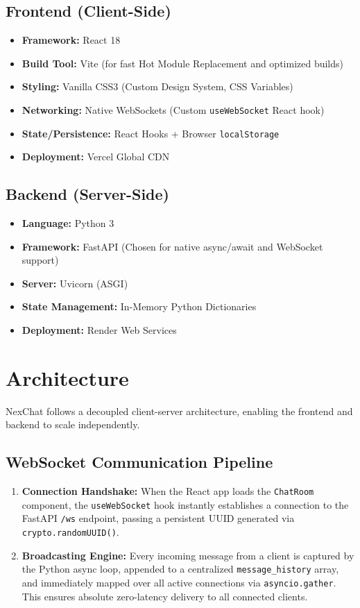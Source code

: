 \documentclass[12pt, a4paper]{article}
\begin{document}
\subsection{Frontend (Client-Side)}
\begin{itemize}
    \item \textbf{Framework:} React 18
    \item \textbf{Build Tool:} Vite (for fast Hot Module Replacement and optimized builds)
    \item \textbf{Styling:} Vanilla CSS3 (Custom Design System, CSS Variables)
    \item \textbf{Networking:} Native WebSockets (Custom \texttt{useWebSocket} React hook)
    \item \textbf{State/Persistence:} React Hooks + Browser \texttt{localStorage}
    \item \textbf{Deployment:} Vercel Global CDN
\end{itemize}

\subsection{Backend (Server-Side)}
\begin{itemize}
    \item \textbf{Language:} Python 3
    \item \textbf{Framework:} FastAPI (Chosen for native async/await and WebSocket support)
    \item \textbf{Server:} Uvicorn (ASGI)
    \item \textbf{State Management:} In-Memory Python Dictionaries
    \item \textbf{Deployment:} Render Web Services
\end{itemize}

\section{Architecture}
NexChat follows a decoupled client-server architecture, enabling the frontend and backend to scale independently.

\subsection{WebSocket Communication Pipeline}
\begin{enumerate}
    \item \textbf{Connection Handshake:} When the React app loads the \texttt{ChatRoom} component, the \texttt{useWebSocket} hook instantly establishes a connection to the FastAPI \texttt{/ws} endpoint, passing a persistent UUID generated via \texttt{crypto.randomUUID()}.
    \item \textbf{Broadcasting Engine:} Every incoming message from a client is captured by the Python async loop, appended to a centralized \texttt{message\_history} array, and immediately mapped over all active connections via \texttt{asyncio.gather}. This ensures absolute zero-latency delivery to all connected clients.
\end{enumerate}
\end{document}
